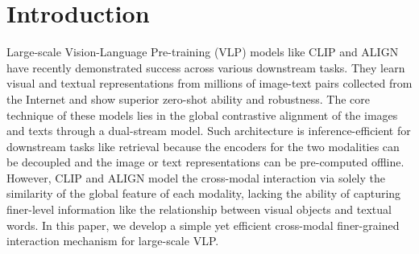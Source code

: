 
\section{Introduction}
Large-scale Vision-Language Pre-training (VLP) models like CLIP \citep{radford2021learning} and ALIGN  \citep{jia2021scaling} have recently demonstrated success across 
various downstream tasks. They learn visual and textual representations from millions of image-text  pairs collected from the Internet and show superior zero-shot ability and robustness. The core technique of these models lies in the global contrastive alignment of the images and texts through a dual-stream model. Such architecture is inference-efficient for downstream tasks like retrieval because the encoders for the two modalities can be decoupled and the image or text representations can be pre-computed offline. 
However, CLIP and ALIGN
model the  cross-modal interaction via solely the similarity of the global feature of each modality, lacking the ability of capturing finer-level information like the relationship between visual objects and textual words.
In this paper, we develop a simple yet efficient cross-modal finer-grained interaction mechanism for large-scale VLP.

